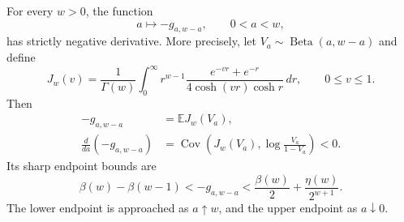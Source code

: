 \begin{theorem}\label{thm:allocation}
For every $w>0$, the function
\[
 a\longmapsto -g_{a,w-a},\qquad 0<a<w,
\]
has strictly negative derivative. More precisely, let
$V_a\sim\operatorname{Beta}(a,w-a)$ and define
\begin{equation}\label{eq:Jw}
 J_w(v)=\frac1{\Gamma(w)}\int_0^\infty
 r^{w-1}\frac{e^{-vr}+e^{-r}}{4\cosh(vr)\cosh r}\,dr,
 \qquad 0\le v\le1.
\end{equation}
Then
\begin{align}
 -g_{a,w-a}&=\mathbb E J_w(V_a),\label{eq:betaallocation}\\
 \frac{d}{da}(-g_{a,w-a})
 &=\operatorname{Cov}\!\left(J_w(V_a),
          \log\frac{V_a}{1-V_a}\right)<0.\label{eq:covariance}
\end{align}
Its sharp endpoint bounds are
\begin{equation}\label{eq:sharpgaussian}
 \boxed{\quad
 \beta(w)-\beta(w-1)<-g_{a,w-a}
 <\frac{\beta(w)}2+\frac{\eta(w)}{2^{w+1}}.
 \quad}
\end{equation}
The lower endpoint is approached as $a\uparrow w$, and the upper endpoint
as $a\downarrow0$.
\end{theorem}
